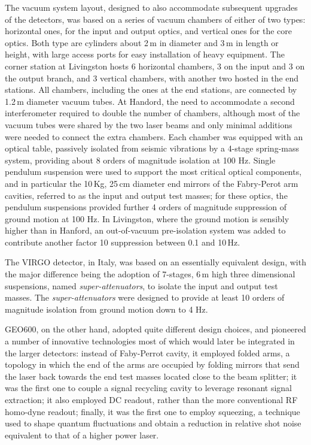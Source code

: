 The vacuum system layout, designed to also accommodate subsequent upgrades of the detectors, was based on a series of vacuum chambers of either of two types: horizontal ones, for the input and output optics, and vertical ones for the core optics.
Both type are cylinders about 2\,m in diameter and 3\,m in length or height, with large access ports for easy installation of heavy equipment.
The corner station at Livingston hosts 6 horizontal chambers, 3 on the input and 3  on the output branch, and 3 vertical chambers, with another two hosted in the end stations.
All chambers, including the ones at the end stations, are connected by 1.2\,m diameter vacuum tubes.
At Handord, the need to accommodate a second interferometer required to double the number of chambers, although most of the vacuum tubes were shared by the two laser beams and only minimal additions were needed to connect the extra chambers.
Each chamber was equipped with an optical table, passively isolated from seismic vibrations by a 4-stage spring-mass system, providing about 8 orders of magnitude isolation at 100 Hz. Single pendulum suspension were used to support the most critical optical components, and in particular the 10\,Kg, 25\,cm diameter end mirrors of the Fabry-Perot arm cavities, referred to as the input and output test masses; for these optics, the pendulum suspensions provided further 4 orders of magnitude suppression of ground motion at 100 Hz.
In Livingston, where the ground motion is sensibly higher than in Hanford, an out-of-vacuum pre-isolation system was added to contribute another factor 10 suppression between 0.1 and 10\,Hz.

The VIRGO detector, in Italy, was based on an essentially equivalent design, with the major difference being the adoption of 7-stages, 6\,m high three dimensional suspensions, named \textit{super-attenuators}, to isolate the input and output test masses.
The \textit{super-attenuators} were designed to provide at least 10 orders of magnitude isolation from ground motion down to 4 Hz.

GEO600, on the other hand, adopted quite different design choices, and pioneered a number of innovative technologies most of which would later be integrated in the larger detectors:
instead of Faby-Perrot cavity, it employed folded arms, a topology in which the end of the arms are occupied by folding mirrors that send the laser back towards the end test masses located close to the beam splitter;
it was the first one to couple a signal recycling cavity to leverage resonant signal extraction;
it also employed DC readout, rather than the more conventional RF homo-dyne readout;
finally, it was the first one to employ squeezing, a technique used to shape quantum fluctuations and obtain a reduction in relative shot noise equivalent to that of a higher power laser.


